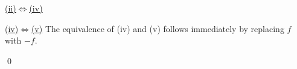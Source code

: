 \vskip 0.5cm \noindent
\underline{(ii)\;$\Longleftrightarrow$\;(iv)}
\vskip 0.2cm \noindent

\vskip 0.5cm \noindent
\underline{(iv)\;$\Longleftrightarrow$\;(v)}
\vskip 0.2cm \noindent
The equivalence of (iv) and (v) follows immediately by replacing $f$ with $-f$.

\qed



\renewcommand{\theenumi}{\roman{enumi}}
\renewcommand{\labelenumi}{\textnormal{(\theenumi)}$\;\;$}

